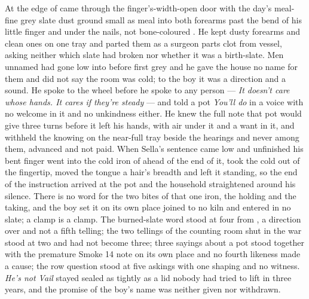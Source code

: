 At the edge of   came through the finger's-width-open door with the day's meal-fine grey slate dust ground small as meal into both forearms past the bend of his little finger and under the nails, not bone-coloured . He kept dusty forearms and clean ones on one tray and parted them as a surgeon parts clot from vessel, asking neither which slate had broken nor whether it was a birth-slate. Men unnamed had gone low into  before first grey and he gave the house no name for them and did not say the room was cold; to the boy it was a direction and a sound. He spoke to the wheel before he spoke to any person --- \emph{It doesn't care whose hands. It cares if they're steady} --- and told a pot \emph{You'll do} in a voice with no welcome in it and no unkindness either. He knew the full note that pot would give three turns before it left his hands, with air under it and a want in it, and withheld the knowing on the near-full tray beside the hearings and never among them, advanced and not paid. When Sella's sentence came low and unfinished his bent finger went into the cold iron of  ahead of the end of it, took the cold out of the fingertip, moved the tongue a hair's breadth and left it standing, so the end of the instruction arrived at the pot and the household straightened around his silence. There is no  word for the two bites of that one iron, the holding and the taking, and the boy set it on its own place joined to no kiln and entered in no slate; a clamp is a clamp. The burned-slate word stood at four from , a direction over  and not a fifth telling; the two tellings of the counting room shut in the war stood at two and had not become three; three sayings about a pot stood together with the premature Smoke 14 note on its own place and no fourth likeness made a cause; the row question stood at five askings with one shaping and no witness. \emph{He's not Vail} stayed sealed as tightly as a lid nobody had tried to lift in three years, and the promise of the boy's name was neither given nor withdrawn.

